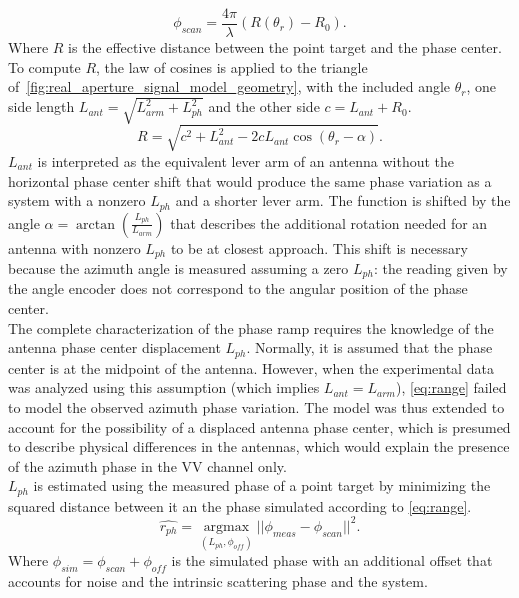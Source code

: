 \begin{equation}\label{eq:range_phase}
	\phi_{scan} = \frac{4 \pi}{\lambda}\left(R\left(\theta_r\right) - R_0\right) .
\end{equation}
Where $R$ is the effective distance between the point target and the phase center.
To compute $R$, the law of cosines is applied to the triangle of~\autoref{fig:real_aperture_signal_model_geometry}, with the included angle $\theta_r$, one side length $L_{ant} = \sqrt{L_{arm}^2 + L_{ph}^2}$ and the other side $c = L_{ant} + R_0$.
\begin{equation}\label{eq:range}
	R = \sqrt{ c^2 +  L_{ant}^2 - 2 c L_{ant} \cos{\left(\theta_r - \alpha\right)}}.
\end{equation}
$L_{ant}$ is interpreted as the equivalent lever arm of an antenna without the horizontal phase center shift that would produce the same phase variation as a system with a nonzero $L_{ph}$ and a shorter lever arm.
The function is shifted by the angle  $\alpha = \operatorname{\arctan}\left({\frac{L_{ph}}{L_{arm}}}\right)$ that describes the additional rotation needed for an antenna with nonzero $L_{ph}$ to be at closest approach. This shift is necessary because the azimuth angle is measured assuming a zero $L_{ph}$: the reading given by the angle encoder does not correspond to the angular position of the phase center.\\
The complete characterization of the phase ramp requires the knowledge of the antenna phase center displacement $L_{ph}$. Normally, it is assumed that the phase center is at the midpoint of the antenna. However, when the experimental data was analyzed using this assumption (which implies $L_{ant} = L_{arm}$),  \autoref{eq:range} failed to model the observed azimuth phase variation. The model was thus extended to account for the possibility of a displaced antenna phase center, which is presumed to describe physical differences in the antennas, which would explain the presence of the azimuth phase in the VV channel only.\\ $L_{ph}$ is estimated using the measured phase of a point target by minimizing the squared distance between it an the phase simulated according to \autoref{eq:range}.
\begin{equation}\label{eq:rph_estimation}
	\hat{r_{ph}} = \underset{\left(L_{ph}, \phi_{off}\right)}{\operatorname{argmax}}{\vert\vert\phi_{meas} - \phi_{scan}\vert\vert}^2.
\end{equation}
Where $\phi_{sim} = \phi_{scan} + \phi_{off}$ is the simulated phase with an additional offset that accounts for noise and the intrinsic scattering phase and the system.\\
